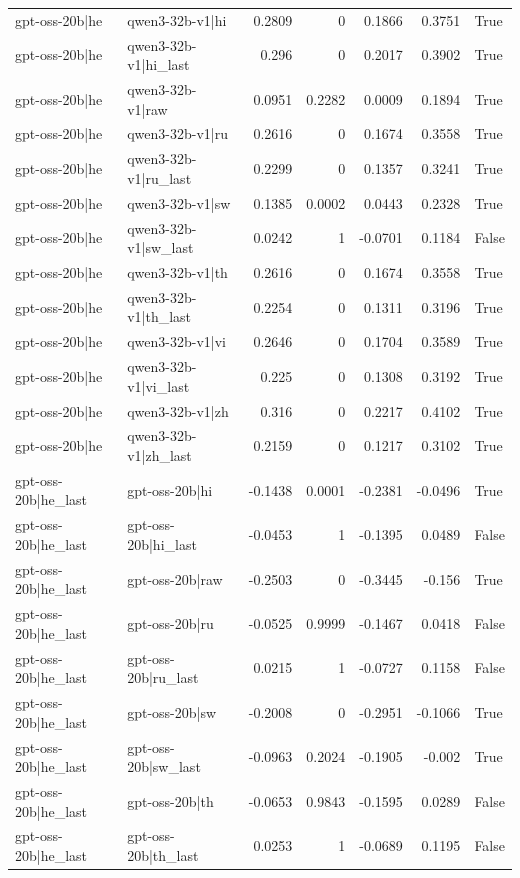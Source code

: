\begin{table}
\begin{tabular}{l l r r r r l}
gpt-oss-20b|he & qwen3-32b-v1|hi & 0.2809 & 0 & 0.1866 & 0.3751 & True \\
gpt-oss-20b|he & qwen3-32b-v1|hi_last & 0.296 & 0 & 0.2017 & 0.3902 & True \\
gpt-oss-20b|he & qwen3-32b-v1|raw & 0.0951 & 0.2282 & 0.0009 & 0.1894 & True \\
gpt-oss-20b|he & qwen3-32b-v1|ru & 0.2616 & 0 & 0.1674 & 0.3558 & True \\
gpt-oss-20b|he & qwen3-32b-v1|ru_last & 0.2299 & 0 & 0.1357 & 0.3241 & True \\
gpt-oss-20b|he & qwen3-32b-v1|sw & 0.1385 & 0.0002 & 0.0443 & 0.2328 & True \\
gpt-oss-20b|he & qwen3-32b-v1|sw_last & 0.0242 & 1 & -0.0701 & 0.1184 & False \\
gpt-oss-20b|he & qwen3-32b-v1|th & 0.2616 & 0 & 0.1674 & 0.3558 & True \\
gpt-oss-20b|he & qwen3-32b-v1|th_last & 0.2254 & 0 & 0.1311 & 0.3196 & True \\
gpt-oss-20b|he & qwen3-32b-v1|vi & 0.2646 & 0 & 0.1704 & 0.3589 & True \\
gpt-oss-20b|he & qwen3-32b-v1|vi_last & 0.225 & 0 & 0.1308 & 0.3192 & True \\
gpt-oss-20b|he & qwen3-32b-v1|zh & 0.316 & 0 & 0.2217 & 0.4102 & True \\
gpt-oss-20b|he & qwen3-32b-v1|zh_last & 0.2159 & 0 & 0.1217 & 0.3102 & True \\
gpt-oss-20b|he_last & gpt-oss-20b|hi & -0.1438 & 0.0001 & -0.2381 & -0.0496 & True \\
gpt-oss-20b|he_last & gpt-oss-20b|hi_last & -0.0453 & 1 & -0.1395 & 0.0489 & False \\
gpt-oss-20b|he_last & gpt-oss-20b|raw & -0.2503 & 0 & -0.3445 & -0.156 & True \\
gpt-oss-20b|he_last & gpt-oss-20b|ru & -0.0525 & 0.9999 & -0.1467 & 0.0418 & False \\
gpt-oss-20b|he_last & gpt-oss-20b|ru_last & 0.0215 & 1 & -0.0727 & 0.1158 & False \\
gpt-oss-20b|he_last & gpt-oss-20b|sw & -0.2008 & 0 & -0.2951 & -0.1066 & True \\
gpt-oss-20b|he_last & gpt-oss-20b|sw_last & -0.0963 & 0.2024 & -0.1905 & -0.002 & True \\
gpt-oss-20b|he_last & gpt-oss-20b|th & -0.0653 & 0.9843 & -0.1595 & 0.0289 & False \\
gpt-oss-20b|he_last & gpt-oss-20b|th_last & 0.0253 & 1 & -0.0689 & 0.1195 & False \\

\end{tabular}
\end{table}
